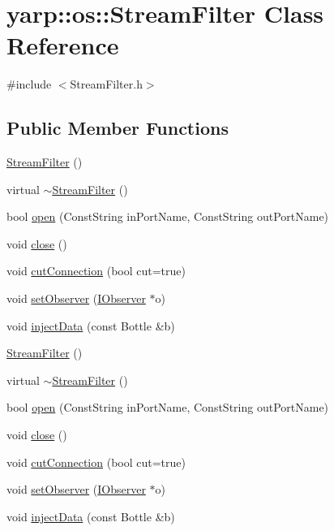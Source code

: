 \hypertarget{classyarp_1_1os_1_1_stream_filter}{
\section{yarp::os::StreamFilter Class Reference}
\label{classyarp_1_1os_1_1_stream_filter}
}


{\ttfamily \#include $<$StreamFilter.h$>$}\subsection*{Public Member Functions}
\begin{DoxyCompactItemize}
\item 
\hyperlink{classyarp_1_1os_1_1_stream_filter_a687a3082652cb3163619fa04bfe9db1f}{StreamFilter} ()
\item 
virtual \hyperlink{classyarp_1_1os_1_1_stream_filter_a39cc5195a93b8146c2f9117298f97581}{$\sim$StreamFilter} ()
\item 
bool \hyperlink{classyarp_1_1os_1_1_stream_filter_aa2203de7321cabb2eb8e8a28b66cc470}{open} (ConstString inPortName, ConstString outPortName)
\item 
void \hyperlink{classyarp_1_1os_1_1_stream_filter_a833b30281a0c6039cdfcded6986fe36e}{close} ()
\item 
void \hyperlink{classyarp_1_1os_1_1_stream_filter_a3c72e672f88e6f9e8d77f7af8bcd31ee}{cutConnection} (bool cut=true)
\item 
void \hyperlink{classyarp_1_1os_1_1_stream_filter_a6f911f0b7818d212d58f05fe82c096a1}{setObserver} (\hyperlink{classyarp_1_1os_1_1_i_observer}{IObserver} $\ast$o)
\item 
void \hyperlink{classyarp_1_1os_1_1_stream_filter_a0dad0b2389fa998afc9336509569a01f}{injectData} (const Bottle \&b)
\item 
\hyperlink{classyarp_1_1os_1_1_stream_filter_aa60e6108b7ab7a492d2265a00fe09773}{StreamFilter} ()
\item 
virtual \hyperlink{classyarp_1_1os_1_1_stream_filter_a024da71ac25badd8895898bc057e3488}{$\sim$StreamFilter} ()
\item 
bool \hyperlink{classyarp_1_1os_1_1_stream_filter_a0e0fdc84804bc82ae32c1100d8ad19db}{open} (ConstString inPortName, ConstString outPortName)
\item 
void \hyperlink{classyarp_1_1os_1_1_stream_filter_aaa31b9321ff08b6122a037b3d721e2d4}{close} ()
\item 
void \hyperlink{classyarp_1_1os_1_1_stream_filter_a1f9ef00b6c094c9489121143a4e38c77}{cutConnection} (bool cut=true)
\item 
void \hyperlink{classyarp_1_1os_1_1_stream_filter_a9e7a3182eaf634a5e80e55411c5019b9}{setObserver} (\hyperlink{classyarp_1_1os_1_1_i_observer}{IObserver} $\ast$o)
\item 
void \hyperlink{classyarp_1_1os_1_1_stream_filter_a86214ed7527aca2157153c2ee3899afd}{injectData} (const Bottle \&b)
\end{DoxyCompactItemize}


